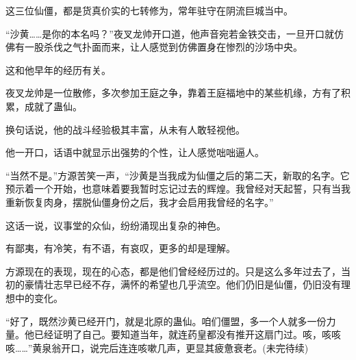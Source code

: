 \begin{this_body}
这三位仙僵，都是货真价实的七转修为，常年驻守在阴流巨城当中。

“沙黄……是你的本名吗？”夜叉龙帅开口道，他声音宛若金铁交击，一旦开口就仿佛有一股杀伐之气扑面而来，让人感觉到仿佛置身在惨烈的沙场中央。

这和他早年的经历有关。

夜叉龙帅是一位散修，多次参加王庭之争，靠着王庭福地中的某些机缘，方有了积累，成就了蛊仙。

换句话说，他的战斗经验极其丰富，从未有人敢轻视他。

他一开口，话语中就显示出强势的个性，让人感觉咄咄逼人。

“当然不是。”方源苦笑一声，“沙黄是当我成为仙僵之后的第二天，新取的名字。它预示着一个开始，也意味着要我暂时忘记过去的辉煌。我曾经对天起誓，只有当我重新恢复肉身，摆脱仙僵身份之后，我才会启用我曾经的名字。”

这话一说，议事堂的众仙，纷纷涌现出复杂的神色。

有鄙夷，有冷笑，有不语，有哀叹，更多的却是理解。

方源现在的表现，现在的心态，都是他们曾经经历过的。只是这么多年过去了，当初的豪情壮志早已经不存，满怀的希望也几乎流空。他们仍旧是仙僵，仍旧没有理想中的变化。

“好了，既然沙黄已经开门，就是北原的蛊仙。咱们僵盟，多一个人就多一份力量。他已经证明了自己。要知道当年，就连药皇都没有推开这扇门过。咳，咳咳咳……”黄泉翁开口，说完后连连咳嗽几声，更显其疲惫衰老。(未完待续)

\end{this_body}

